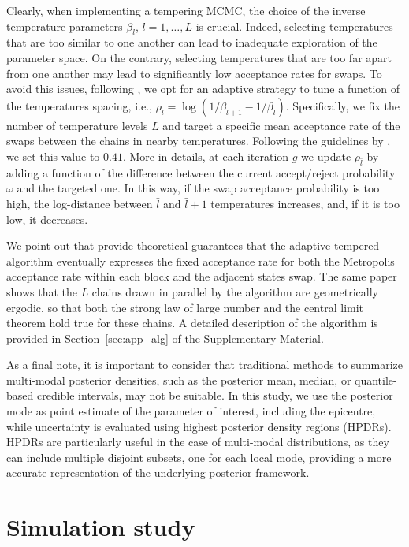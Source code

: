 \documentclass[final]{statsoc}
\begin{document}
Clearly, when implementing a tempering MCMC, the choice of the inverse temperature parameters $\beta_l$, $l=1, \dots, L$ is crucial. Indeed, selecting temperatures that are too similar to  one another can lead to inadequate exploration of the parameter space. On the contrary, selecting temperatures that are too far apart from one another may lead to significantly low acceptance rates for swaps. To avoid this issues, following \cite{miasojedow2013adaptive}, we opt for an adaptive strategy to tune a function of the temperatures spacing, i.e., $\rho_{l} = \log ( 1/\beta_{l+1} - 1/\beta_{l} )$. Specifically, we fix the  number of temperature levels $L$ and target a specific mean acceptance rate of the swaps between the chains in nearby temperatures. Following the guidelines by \citep{atchade2005adaptive}, we set this value to $0.41$. More in details, at each iteration $g$ we update $\rho_{\bar{l}}$ by adding a function of the difference between the current accept/reject probability $\omega$ and the targeted one. In this way, if the swap acceptance probability is too high, the log-distance between $\bar{l}$ and $\bar{l} + 1$ temperatures increases, and, if it is too low, it decreases. 

We point  out that \citet{miasojedow2013adaptive} provide theoretical guarantees that the adaptive tempered algorithm eventually expresses the fixed acceptance rate for both the Metropolis acceptance rate within each block and the adjacent states swap. The same paper shows that the $L$ chains drawn in parallel by the algorithm are geometrically ergodic, so that both the strong law of large number and the central limit theorem hold true for these chains. A detailed description of the algorithm is provided in Section~\ref{sec:app_alg} of the Supplementary Material.

As a final note, it is important to consider that traditional methods to summarize multi-modal posterior densities, such as the posterior mean, median, or quantile-based credible intervals, may not be suitable. In this study, we use the posterior mode as point estimate of the parameter of interest, including the epicentre, while uncertainty is evaluated using highest posterior density regions (HPDRs). HPDRs are particularly useful in the case of multi-modal distributions, as they can include multiple disjoint subsets, one for each local mode, providing a more accurate representation of the underlying posterior framework.

\section{Simulation study}\label{sec:simulation}
\end{document}
